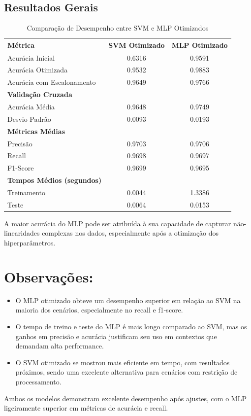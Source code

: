 \documentclass[12pt,a4paper,oneside,openany]{article}
\begin{document}
\subsection{Resultados Gerais}
\begin{table}[ht]
\centering
\begin{tabular}{|l|c|c|}
\hline
\textbf{Métrica} & \textbf{SVM Otimizado} & \textbf{MLP Otimizado} \\
\hline
Acurácia Inicial & 0.6316 & 0.9591 \\
Acurácia Otimizada & 0.9532 & 0.9883 \\
Acurácia com Escalonamento & 0.9649 & 0.9766 \\
\hline
\textbf{Validação Cruzada} & & \\
Acurácia Média & 0.9648 & 0.9749 \\
Desvio Padrão & 0.0093 & 0.0193 \\
\hline
\textbf{Métricas Médias} & & \\
Precisão & 0.9703 & 0.9706 \\
Recall & 0.9698 & 0.9697 \\
F1-Score & 0.9699 & 0.9695 \\
\hline
\textbf{Tempos Médios (segundos)} & & \\
Treinamento & 0.0044 & 1.3386 \\
Teste & 0.0064 & 0.0153 \\
\hline
\end{tabular}
\caption{Comparação de Desempenho entre SVM e MLP Otimizados}
\end{table}
\noindent
A maior acurácia do MLP pode ser atribuída à sua capacidade de capturar não-linearidades complexas nos dados, especialmente após a otimização dos hiperparâmetros.

\section*{Observações:}

\begin{itemize}
    \item O MLP otimizado obteve um desempenho superior em relação ao SVM na maioria dos cenários, especialmente no recall e f1-score.
    \item O tempo de treino e teste do MLP é mais longo comparado ao SVM, mas os ganhos em precisão e acurácia justificam seu uso em contextos que demandam alta performance.
    \item O SVM otimizado se mostrou mais eficiente em tempo, com resultados próximos, sendo uma excelente alternativa para cenários com restrição de processamento.
\end{itemize}
\noindent
Ambos os modelos demonstram excelente desempenho após ajustes, com o MLP ligeiramente superior em métricas de acurácia e recall.
\end{document}
